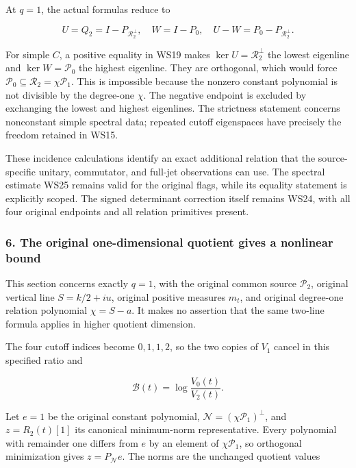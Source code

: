 At \(q=1\), the actual formulas reduce to

\[
U=Q_2=I-P_{\mathcal R_2^\perp},
\quad W=I-P_0,
\quad U-W=P_0-P_{\mathcal R_2^\perp}.
\tag{WS29}
\]

For simple \(C\), a positive equality in WS19 makes \(\ker U=\mathcal R_2^\perp\) the lowest eigenline and \(\ker W=\mathcal P_0\) the highest eigenline. They are orthogonal, which would force \(\mathcal P_0\subseteq\mathcal R_2=\chi\mathcal P_1\). This is impossible because the nonzero constant polynomial is not divisible by the degree-one \(\chi\). The negative endpoint is excluded by exchanging the lowest and highest eigenlines. The strictness statement concerns nonconstant simple spectral data; repeated cutoff eigenspaces have precisely the freedom retained in WS15.

These incidence calculations identify an exact additional relation that the source-specific unitary, commutator, and full-jet observations can use. The spectral estimate WS25 remains valid for the original flags, while its equality statement is explicitly scoped. The signed determinant correction itself remains WS24, with all four original endpoints and all relation primitives present.

\subsubsection{6. The original one-dimensional quotient gives a nonlinear bound}\label{endpoint-window_review--the-original-one-dimensional-quotient-gives-a-nonlinear-bound}

This section concerns exactly \(q=1\), with the original common source \(\mathcal P_2\), original vertical line \(S=k/2+iu\), original positive measures \(m_t\), and original degree-one relation polynomial \(\chi=S-a\). It makes no assertion that the same two-line formula applies in higher quotient dimension.

The four cutoff indices become \(0,1,1,2\), so the two copies of \(V_1\) cancel in this specified ratio and

\[
\mathcal B(t)=\log\frac{V_0(t)}{V_2(t)}.
\tag{WS30}
\]

Let \(e=1\) be the original constant polynomial, \(\mathcal N=(\chi\mathcal P_1)^\perp\), and \(z=R_2(t)[1]\) its canonical minimum-norm representative. Every polynomial with remainder one differs from \(e\) by an element of \(\chi\mathcal P_1\), so orthogonal minimization gives \(z=P_{\mathcal N}e\). The norms are the unchanged quotient values

